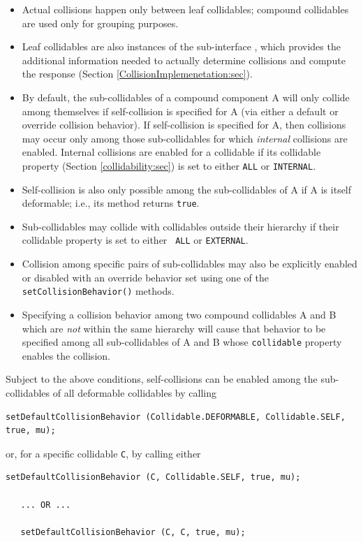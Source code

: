 \begin{itemize}

\item Actual collisions happen only between leaf collidables; compound
collidables are used only for grouping purposes.

\item Leaf collidables are also instances of the sub-interface
, which provides the
additional information needed to actually determine collisions and
compute the response (Section \ref{CollisionImplemenetation:sec}).

\item By default, the sub-collidables of a compound component A will
only collide among themselves if self-collision is specified for A
(via either a default or override collision behavior). If
self-collision is specified for A, then collisions may occur only
among those sub-collidables for which {\it internal} collisions are
enabled.  Internal collisions are enabled for a collidable if its {\sf
collidable} property (Section \ref{collidability:sec}) is set to
either {\tt ALL} or {\tt INTERNAL}.

\item Self-collision is also only possible among the sub-collidables
of A if A is itself deformable; i.e., its
method returns {\tt true}.

\item Sub-collidables may collide with collidables outside their
hierarchy if their {\sf collidable} property is set to either {\tt
ALL} or {\tt EXTERNAL}.

\item Collision among specific pairs of sub-collidables may also be
explicitly enabled or disabled with an override behavior set using one
of the {\tt setCollisionBehavior()} methods.

\item Specifying a collision behavior among two compound collidables A
and B which are {\it not} within the same hierarchy will cause that
behavior to be specified among all sub-collidables of A and B whose
{\tt collidable} property enables the collision.

\end{itemize}

Subject to the above conditions, self-collisions can be enabled among
the sub-collidables of all deformable collidables by calling
%
\begin{lstlisting}[]
   setDefaultCollisionBehavior (Collidable.DEFORMABLE, Collidable.SELF, true, mu);
\end{lstlisting}
%
or, for a specific collidable {\tt C}, by calling either
%
\begin{lstlisting}[]
   setDefaultCollisionBehavior (C, Collidable.SELF, true, mu);

   ... OR ...

   setDefaultCollisionBehavior (C, C, true, mu);
\end{lstlisting}
%

